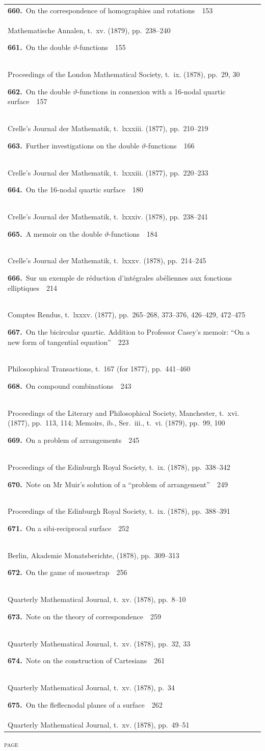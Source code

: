 \documentclass[11pt,a4paper]{book}
\newcommand{\paperentry}[4]{%
  \noindent\textbf{#1.}\ {#2}\ \dotfill\ {#3}\\[-0.2em]%
  {\small #4}\par\vspace{0.6em}%
}
\begin{document}
\begin{center}
\begin{tabular}{p{4.2in}r}
\paperentry{660}{On the correspondence of homographies and rotations}{153}{Mathematische Annalen, t.~xv. (1879), pp.~238--240}
\paperentry{661}{On the double $\vartheta$-functions}{155}{Proceedings of the London Mathematical Society, t.~ix. (1878), pp.~29, 30}
\paperentry{662}{On the double $\vartheta$-functions in connexion with a 16-nodal quartic surface}{157}{Crelle's Journal der Mathematik, t.~lxxxiii. (1877), pp.~210--219}
\paperentry{663}{Further investigations on the double $\vartheta$-functions}{166}{Crelle's Journal der Mathematik, t.~lxxxiii. (1877), pp.~220--233}
\paperentry{664}{On the 16-nodal quartic surface}{180}{Crelle's Journal der Mathematik, t.~lxxxiv. (1878), pp.~238--241}
\paperentry{665}{A memoir on the double $\vartheta$-functions}{184}{Crelle's Journal der Mathematik, t.~lxxxv. (1878), pp.~214--245}
\paperentry{666}{Sur un exemple de r\'{e}duction d'int\'{e}grales ab\'{e}liennes aux fonctions elliptiques}{214}{Comptes Rendus, t.~lxxxv. (1877), pp.~265--268, 373--376, 426--429, 472--475}
\paperentry{667}{On the bicircular quartic. Addition to Professor Casey's memoir: ``On a new form of tangential equation''}{223}{Philosophical Transactions, t.~167 (for 1877), pp.~441--460}
\paperentry{668}{On compound combinations}{243}{Proceedings of the Literary and Philosophical Society, Manchester, t.~xvi. (1877), pp.~113, 114; Memoirs, ib., Ser.~iii., t.~vi. (1879), pp.~99, 100}
\paperentry{669}{On a problem of arrangements}{245}{Proceedings of the Edinburgh Royal Society, t.~ix. (1878), pp.~338--342}
\paperentry{670}{Note on Mr Muir's solution of a ``problem of arrangement''}{249}{Proceedings of the Edinburgh Royal Society, t.~ix. (1878), pp.~388--391}
\paperentry{671}{On a sibi-reciprocal surface}{252}{Berlin, Akademie Monatsberichte, (1878), pp.~309--313}
\paperentry{672}{On the game of mousetrap}{256}{Quarterly Mathematical Journal, t.~xv. (1878), pp.~8--10}
\paperentry{673}{Note on the theory of correspondence}{259}{Quarterly Mathematical Journal, t.~xv. (1878), pp.~32, 33}
\paperentry{674}{Note on the construction of Cartesians}{261}{Quarterly Mathematical Journal, t.~xv. (1878), p.~34}
\paperentry{675}{On the fleflecnodal planes of a surface}{262}{Quarterly Mathematical Journal, t.~xv. (1878), pp.~49--51}
\end{tabular}
\end{center}

\newpage
\thispagestyle{fancy}
\begin{center}
{\small\textsc{page}}
\end{center}
\vspace{-0.5em}
\end{document}

